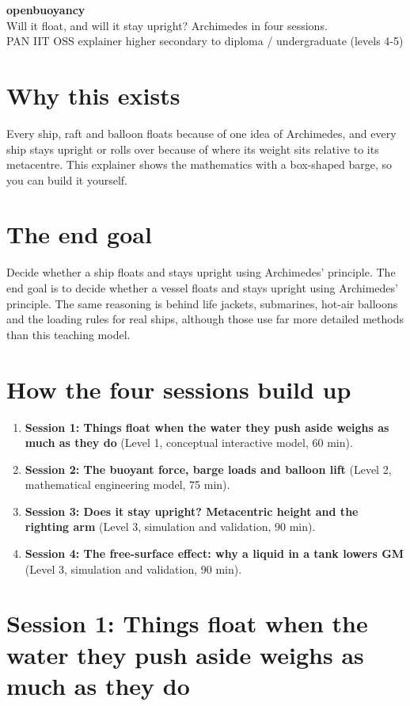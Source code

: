 \documentclass[11pt,a4paper]{article}
\begin{document}
\begin{center}{\LARGE\bfseries openbuoyancy}\\[0.4em]{\large Will it float, and will it stay upright? Archimedes in four sessions.}\\[0.2em]\small PAN IIT OSS explainer \textbullet{} higher secondary to diploma / undergraduate (levels 4-5)\end{center}

\section*{Why this exists}
Every ship, raft and balloon floats because of one idea of Archimedes, and every ship stays upright or rolls over because of where its weight sits relative to its metacentre. This explainer shows the mathematics with a box-shaped barge, so you can build it yourself.

\section*{The end goal}
Decide whether a ship floats and stays upright using Archimedes' principle. The end goal is to decide whether a vessel floats and stays upright using Archimedes' principle. The same reasoning is behind life jackets, submarines, hot-air balloons and the loading rules for real ships, although those use far more detailed methods than this teaching model.

\section*{How the four sessions build up}
\begin{enumerate}[nosep]
\item \textbf{Session 1: Things float when the water they push aside weighs as much as they do} (Level 1, conceptual interactive model, 60 min).
\item \textbf{Session 2: The buoyant force, barge loads and balloon lift} (Level 2, mathematical engineering model, 75 min).
\item \textbf{Session 3: Does it stay upright? Metacentric height and the righting arm} (Level 3, simulation and validation, 90 min).
\item \textbf{Session 4: The free-surface effect: why a liquid in a tank lowers GM} (Level 3, simulation and validation, 90 min).
\end{enumerate}

\section{Session 1: Things float when the water they push aside weighs as much as they do}
\end{document}
